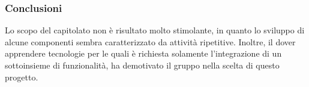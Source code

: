 \subsubsection{Conclusioni}
Lo scopo del capitolato non è risultato molto stimolante, in quanto lo
sviluppo di alcune componenti sembra caratterizzato da attività ripetitive.
Inoltre, il dover apprendere tecnologie per le quali è richiesta solamente 
l'integrazione di un sottoinsieme di funzionalità, ha demotivato il gruppo nella 
scelta di questo progetto.
